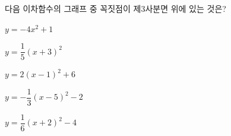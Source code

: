 다음 이차함수의 그래프 중 꼭짓점이 제$3$사분면 위에 있는 것은?
\begin{choicesii}{\rule[-3ex]{0pt}{8ex}$y=-4x^2+1$}{\rule[-3ex]{0pt}{8ex}$y=\dfrac{1}{5}(x+3)^2$}{\rule[-3ex]{0pt}{8ex}$y=2(x-1)^2+6$}{\rule[-3ex]{0pt}{8ex}$y=-\dfrac{1}{3}(x-5)^2-2$}{\rule[-3ex]{0pt}{8ex}$y=\dfrac{1}{6}(x+2)^2-4$}\end{choicesii}
